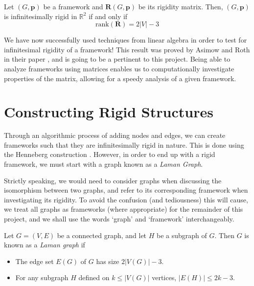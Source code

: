 \begin{theorem}
\label{thm: rank-rigid}
\cite{counting_frameworks} Let $(G,\mathbf{p})$ be a framework and $\mathbf{R}(G,\mathbf{p})$ be its rigidity matrix. Then, $(G,\mathbf{p})$ is infinitesimally rigid in $\mathbb{R}^2$ if and only if 
\[
\text{rank}(\mathbf{R}) = 2|V| - 3
\]
\end{theorem}

\begin{flushleft}
We have now successfully used techniques from linear algebra in order to test for infinitesimal rigidity of a framework! This result was proved by Asimow and Roth in their paper \cite{asimow}, and is going to be a pertinent to this project. Being able to analyze frameworks using matrices enables us to computationally investigate properties of the matrix, allowing for a speedy analysis of a given framework.
\end{flushleft}

\section{Constructing Rigid Structures}
Through an algorithmic process of adding nodes and edges, we can create frameworks such that they are infinitesimally rigid in nature. This is done using the Henneberg construction \cite{henneberg}. However, in order to end up with a rigid framework, we must start with a graph known as a \textit{Laman Graph}.

\begin{flushleft}
Strictly speaking, we would need to consider graphs when discussing the isomorphism between two graphs, and refer to its corresponding framework when investigating its rigidity. To avoid the confusion (and tediousness) this will cause, we treat all graphs as frameworks (where appropriate) for the remainder of this project, and we shall use the words `graph' and `framework' interchangeably.
\end{flushleft}

\begin{definition}
\label{def: laman graph}
Let $G = (V,E)$ be a connected graph, and let $H$ be a subgraph of $G$. Then $G$ is known as a \textit{Laman graph} if
\begin{itemize}
    \item The edge set $E(G)$ of $G$ has size $2|V(G)| - 3$.
    \item For any subgraph $H$ defined on $k \leq |V(G)|$ vertices, $|E(H)| \leq 2k-3$.
\end{itemize}
\end{definition}

